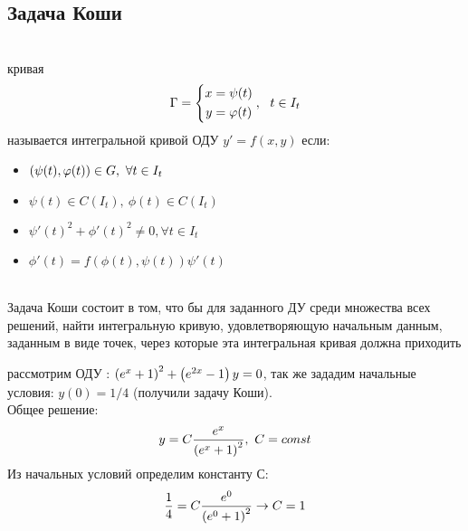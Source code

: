 \subsection{\large{Задача Коши}}
\begin{Def}  \\
кривая
\begin{equation}
    \Gamma = \left\{ \begin{aligned}
x &= \psi(t) \\
y &= \varphi(t)
\end{aligned} \right., ~~t \in I_t
\end{equation}
называется интегральной кривой ОДУ $y' = f(x, y)$ если: 
\begin{itemize}
    \item $( \psi(t),  \varphi(t) ) \in G, ~ \forall t \in I_t$
    \item $\psi(t) \in C(I_t), ~\phi(t) \in C(I_t)$
    \item  $\psi'(t)^2 + \phi'(t)^2 \neq 0, \forall t \in I_t$
    \item $\phi'(t) = f(\phi(t), \psi(t)) \psi'(t)$
\end{itemize}
\end{Def}
\begin{Def} \\
Задача Коши состоит в том, что бы для заданного ДУ среди множества всех решений, найти интегральную кривую, удовлетворяющую начальным данным, заданным в виде точек, через которые эта интегральная кривая должна приходить
\end{Def}
\begin{example}
рассмотрим ОДУ : $ \left( e^x+1 \right)^2 + \left( e^{2x}-1 \right)y = 0$, так же зададим начальные условия: $y(0) = 1 / 4$ (получили задачу Коши).\\
Общее решение:
\begin{equation}
    y = C \frac{e^x}{ \left( e^x+1 \right)^2}, ~ C = const
\end{equation}
Из начальных условий определим константу С:
\begin{equation}
    \frac{1}{4} = C \frac{e^0}{ \left( e^0+1 \right)^2} \rightarrow  C = 1
\end{equation}
\end{example}
